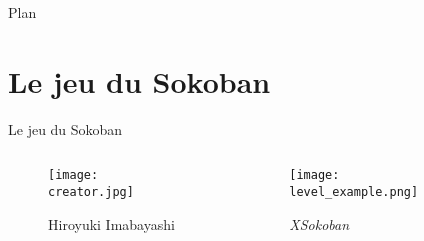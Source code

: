 




    \maketitle

    \begin{frame}{Plan}
        \tableofcontents%
    \end{frame}

    \section{Le jeu du Sokoban}
        \begin{frame}{Le jeu du Sokoban}
            \begin{columns}
                \begin{column}{0.3\textwidth}
                    \begin{figure}
                        \centering
                        \texttt{[image: creator.jpg]}
                        \caption*{Hiroyuki Imabayashi}
                    \end{figure}
                \end{column}
                \begin{column}{0.7\textwidth}
                    \begin{figure}
                        \centering
                        \texttt{[image: level\_example.png]}
                        \caption*{\textit{XSokoban}}
                    \end{figure}
                \end{column}
            \end{columns}
        \end{frame}

